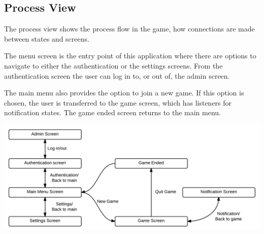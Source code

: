 \subsection{Process View}
The process view shows the process flow in the game, how connections are made
between states and screens.

The menu screen is the entry point of this application where there are options
to navigate to either the authentication or the settings screens. From the
authentication screen the user can log in to, or out of, the admin screen.

The main menu also provides the option to join a new game. If this option is
chosen, the user is transferred to the game screen, which has listeners for
notification states. The game ended screen returns to the main menu.
\begin{center}
\includegraphics[clip=true, width=0.9 \textwidth]{assets/ProcessView.png}
\label{ref:gantt}
\end{center}

